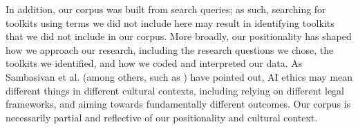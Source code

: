 \documentclass[acmsmall]{acmart}
\begin{document}
In addition, our corpus was built from search queries; as such, searching for toolkits using terms we did not include here may result in identifying toolkits that we did not include in our corpus. More broadly, our positionality has shaped how we approach our research, including the research questions we chose, the toolkits we identified, and how we coded and interpreted our data. As Sambasivan et al. \cite{sambasivan2021reimagining} (among others, such as \citet{ding2018deciphering}) have pointed out, AI ethics may mean different things in different cultural contexts, including %
relying on different legal frameworks, and aiming towards fundamentally different outcomes. Our corpus is necessarily partial and reflective of our positionality and cultural context. %



\end{document}
